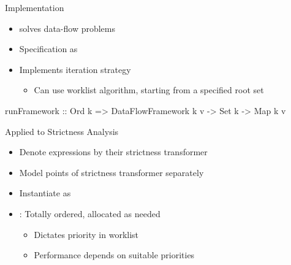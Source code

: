 \documentclass{haskellbeamer}
\begin{document}
\begin{frame}[fragile]{Implementation}
  \begin{itemize}
    \item {} solves data-flow problems 
    \item Specification as 
    \item Implements iteration strategy
      \begin{itemize}
        \item Can use worklist algorithm, starting from a specified root set
      \end{itemize}
  \end{itemize}
  \begin{center}
    \begin{minipage}{0.5\textwidth}
      \begin{haskell}
        runFramework
          :: Ord k
          => DataFlowFramework k v
          -> Set k
          -> Map k v
      \end{haskell}
    \end{minipage}
  \end{center}
\end{frame}

\begin{frame}[fragile]{Applied to Strictness Analysis}
  \begin{itemize}
    \item Denote expressions by their strictness transformer
    \item Model points of strictness transformer separately
    \item Instantiate as 
    \item {}: Totally ordered, allocated as needed
      \begin{itemize}
        \item Dictates priority in worklist
        \item Performance depends on suitable priorities
      \end{itemize}
  \end{itemize}
\end{frame}
\end{document}

